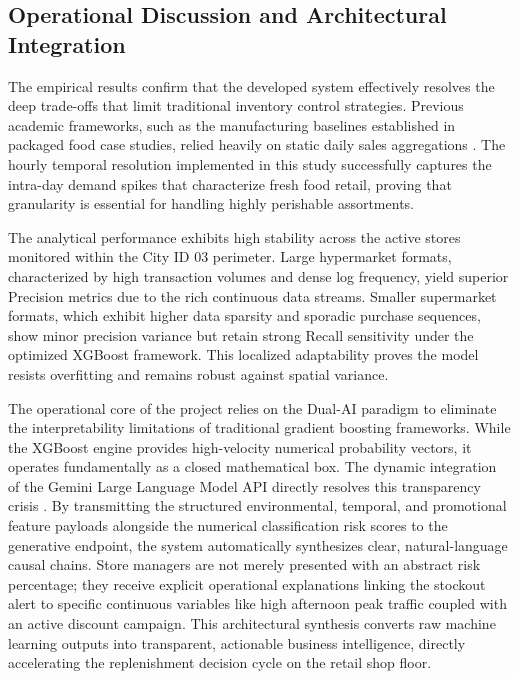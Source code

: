 \documentclass[11pt, a4paper]{article}
\begin{document}
\subsection{Operational Discussion and Architectural Integration}
The empirical results confirm that the developed system effectively resolves the deep trade-offs that limit traditional inventory control strategies. Previous academic frameworks, such as the manufacturing baselines established in packaged food case studies, relied heavily on static daily sales aggregations \cite{huber2017cluster}. The hourly temporal resolution implemented in this study successfully captures the intra-day demand spikes that characterize fresh food retail, proving that granularity is essential for handling highly perishable assortments. 

The analytical performance exhibits high stability across the active stores monitored within the City ID 03 perimeter. Large hypermarket formats, characterized by high transaction volumes and dense log frequency, yield superior Precision metrics due to the rich continuous data streams. Smaller supermarket formats, which exhibit higher data sparsity and sporadic purchase sequences, show minor precision variance but retain strong Recall sensitivity under the optimized XGBoost framework. This localized adaptability proves the model resists overfitting and remains robust against spatial variance.

The operational core of the project relies on the Dual-AI paradigm to eliminate the interpretability limitations of traditional gradient boosting frameworks. While the XGBoost engine provides high-velocity numerical probability vectors, it operates fundamentally as a closed mathematical box. The dynamic integration of the Gemini Large Language Model API directly resolves this transparency crisis \cite{duan2024llm_supplychain, jackson2024genai}. By transmitting the structured environmental, temporal, and promotional feature payloads alongside the numerical classification risk scores to the generative endpoint, the system automatically synthesizes clear, natural-language causal chains. Store managers are not merely presented with an abstract risk percentage; they receive explicit operational explanations linking the stockout alert to specific continuous variables like high afternoon peak traffic coupled with an active discount campaign. This architectural synthesis converts raw machine learning outputs into transparent, actionable business intelligence, directly accelerating the replenishment decision cycle on the retail shop floor.
\end{document}
